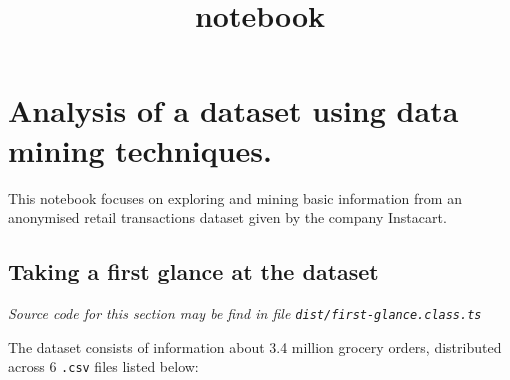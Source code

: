 \documentclass[11pt]{article}
\title{notebook}
\begin{document}
    
    
    \maketitle
    
    

    
    \hypertarget{analysis-of-a-dataset-using-data-mining-techniques.}{%
\section{Analysis of a dataset using data mining
techniques.}\label{analysis-of-a-dataset-using-data-mining-techniques.}}

This notebook focuses on exploring and mining basic information from an
anonymised retail transactions dataset given by the company Instacart.

\hypertarget{taking-a-first-glance-at-the-dataset}{%
\subsection{Taking a first glance at the
dataset}\label{taking-a-first-glance-at-the-dataset}}

\emph{Source code for this section may be find in file
\texttt{dist/first-glance.class.ts}}

The dataset consists of information about 3.4 million grocery orders,
distributed across 6 \texttt{.csv} files listed below:
\end{document}
